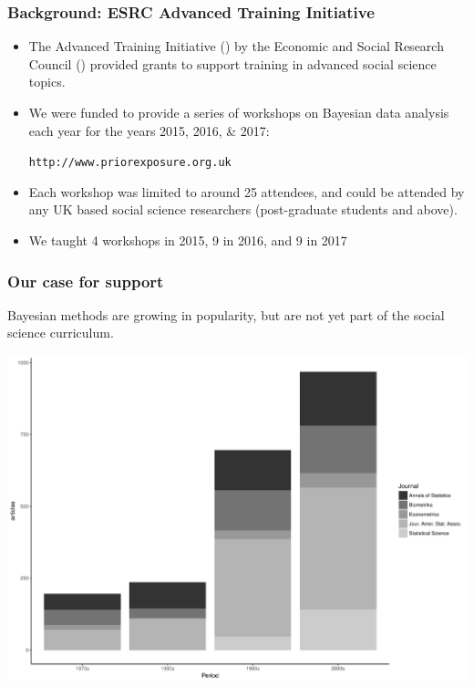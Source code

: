 \begin{frame}
	\frametitle{Background: ESRC Advanced Training Initiative}

	\begin{itemize}

		\item The Advanced Training Initiative (\ati) by the Economic
			and Social Research Council (\esrc) provided grants to
			support training in advanced social science topics.

		\item We were funded to provide a series of workshops on Bayesian data analysis each year for the years 2015, 2016, \& 2017:\\
			{\begin{center}\texttt{http://www.priorexposure.org.uk}\end{center}}

		\item Each workshop was limited to around 25 attendees, and could be attended by any UK based social science researchers (post-graduate students and above).

		\item We taught 4 workshops in 2015, 9 in 2016, and 9 in 2017

	\end{itemize}

\end{frame}

\begin{frame}
	\frametitle{Our case for support}
		Bayesian methods are growing in popularity, but are not yet part of the social science curriculum.

		\includegraphics[width=\textwidth]{articles.pdf}
\end{frame}

